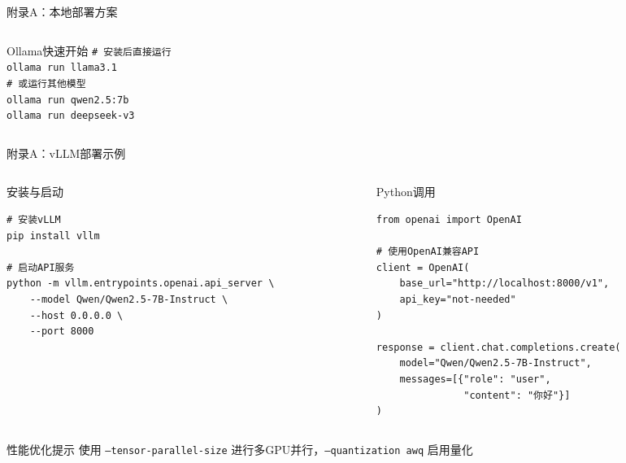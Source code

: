 \documentclass[aspectratio=169,11pt]{beamer}
\begin{document}
\begin{frame}{附录A：本地部署方案}
\begin{columns}
\begin{column}{0.52\textwidth}
            \vspace{0.2cm}
            \begin{exampleblock}{Ollama快速开始}
                \ttfamily\tiny
                \texttt{\# 安装后直接运行}\\[0.1cm]
                \texttt{ollama run llama3.1}\\[0.1cm]
                \texttt{\# 或运行其他模型}\\[0.1cm]
                \texttt{ollama run qwen2.5:7b}\\[0.1cm]
                \texttt{ollama run deepseek-v3}
            \end{exampleblock}
        \end{column}
    \end{columns}
\end{frame}

\begin{frame}[fragile]{附录A：vLLM部署示例}
    \begin{columns}
        \begin{column}{0.5\textwidth}
            \begin{block}{安装与启动}
\begin{verbatim}
# 安装vLLM
pip install vllm

# 启动API服务
python -m vllm.entrypoints.openai.api_server \
    --model Qwen/Qwen2.5-7B-Instruct \
    --host 0.0.0.0 \
    --port 8000
\end{verbatim}
            \end{block}
        \end{column}
        \begin{column}{0.5\textwidth}
            \begin{block}{Python调用}
\begin{verbatim}
from openai import OpenAI

# 使用OpenAI兼容API
client = OpenAI(
    base_url="http://localhost:8000/v1",
    api_key="not-needed"
)

response = client.chat.completions.create(
    model="Qwen/Qwen2.5-7B-Instruct",
    messages=[{"role": "user", 
               "content": "你好"}]
)
\end{verbatim}
            \end{block}
        \end{column}
    \end{columns}
    
    \vspace{0.3cm}
    \begin{alertblock}{性能优化提示}
        \small
        使用 \texttt{--tensor-parallel-size} 进行多GPU并行，\texttt{--quantization awq} 启用量化
    \end{alertblock}
\end{frame}
\end{document}
